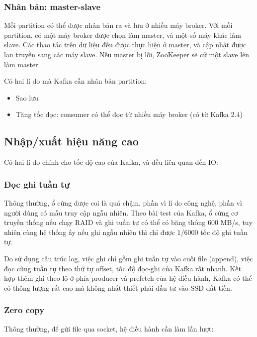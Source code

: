 \documentclass{article}
\begin{document}
\subsubsection{Nhân bản: master-slave}

Mỗi partition có thể được nhân bản ra và lưu ở nhiều máy broker. Với mỗi
partition, có một máy broker được chọn làm master, và một số máy khác làm slave.
Các thao tác trên dữ liệu đều được thực hiện ở master, và cập nhật được lan
truyền sang các máy slave. Nếu master bị lỗi, ZooKeeper sẽ cử một slave lên làm
master.

Có hai lí do mà Kafka cần nhân bản partition:

\begin{itemize}
    \item Sao lưu
    \item Tăng tốc đọc: consumer có thể đọc từ nhiều máy broker (có từ Kafka
    2.4)
\end{itemize}

\subsection{Nhập/xuất hiệu năng cao}

Có hai lí do chính cho tốc độ cao của Kafka, và đều liên quan đến IO:

\subsubsection{Đọc ghi tuần tự}

Thông thường, ổ cứng được coi là quá chậm, phần vì lí do công nghệ, phần vì
người dùng có mẫu truy cập ngẫu nhiên. Theo bài test của Kafka, ổ cứng cơ truyền
thống nếu chạy RAID và ghi tuần tự có thể có băng thông 600 MB/s, tuy nhiên cùng
hệ thống ấy nếu ghi ngẫu nhiên thì chỉ được 1/6000 tốc độ ghi tuần tự.

Do sử dụng cấu trúc log, việc ghi chỉ gồm ghi tuần tự vào cuối file (append),
việc đọc cũng tuần tự theo thứ tự offset, tốc độ đọc-ghi của Kafka rất nhanh.
Kết hợp thêm ghi theo lô ở phía producer và prefetch của hệ điều hành, Kafka có
thể có thông lượng rất cao mà không nhất thiết phải đầu tư vào SSD đắt tiền.

\subsubsection{Zero copy}

Thông thường, để gửi file qua socket, hệ điều hành cần làm lần lượt:
\end{document}
